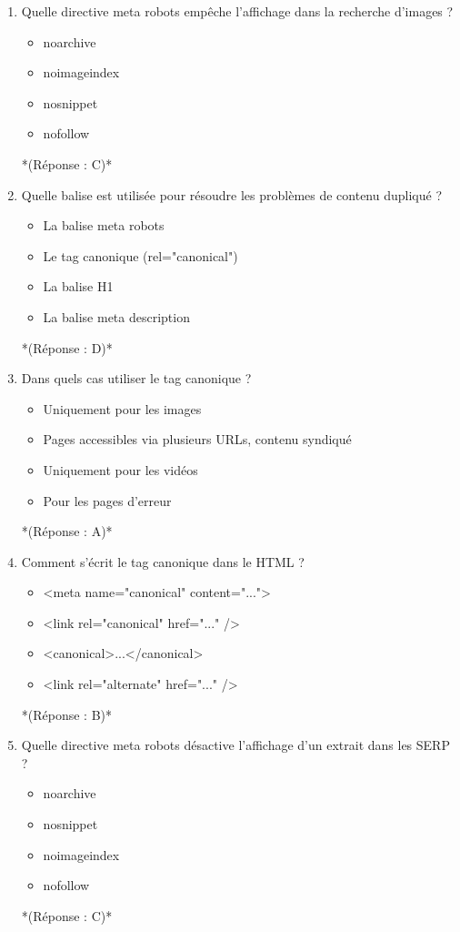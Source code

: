 \documentclass[12pt,a4paper,twoside]{report}
\begin{document}
\begin{enumerate}
\item Quelle directive meta robots empêche l'affichage dans la recherche d'images ?
\begin{itemize}
\item[A)] noarchive
\item[B)] noimageindex
\item[C)] nosnippet
\item[D)] nofollow
\end{itemize}
*(Réponse : C)*

\item Quelle balise est utilisée pour résoudre les problèmes de contenu dupliqué ?
\begin{itemize}
\item[A)] La balise meta robots
\item[B)] Le tag canonique (rel="canonical")
\item[C)] La balise H1
\item[D)] La balise meta description
\end{itemize}
*(Réponse : D)*

\item Dans quels cas utiliser le tag canonique ?
\begin{itemize}
\item[A)] Uniquement pour les images
\item[B)] Pages accessibles via plusieurs URLs, contenu syndiqué
\item[C)] Uniquement pour les vidéos
\item[D)] Pour les pages d'erreur
\end{itemize}
*(Réponse : A)*

\item Comment s'écrit le tag canonique dans le HTML ?
\begin{itemize}
\item[A)] <meta name="canonical" content="...">
\item[B)] <link rel="canonical" href="..." />
\item[C)] <canonical>...</canonical>
\item[D)] <link rel="alternate" href="..." />
\end{itemize}
*(Réponse : B)*

\item Quelle directive meta robots désactive l'affichage d'un extrait dans les SERP ?
\begin{itemize}
\item[A)] noarchive
\item[B)] nosnippet
\item[C)] noimageindex
\item[D)] nofollow
\end{itemize}
*(Réponse : C)*


\end{enumerate}
\end{document}
